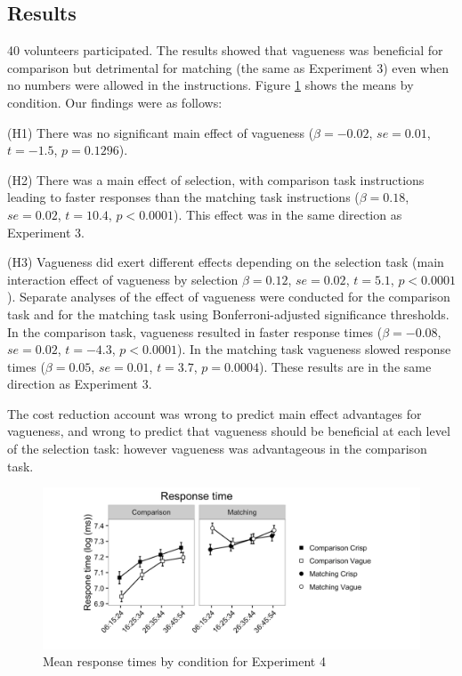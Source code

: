 \documentclass[%
man,		%
floatsintext,%
apacite%
]{apa6}
\begin{document}
\subsection{Results}%
40 volunteers participated.
The results showed that vagueness was beneficial for comparison but detrimental for matching (the same as Experiment 3) even when no numbers were allowed in the instructions. 
Figure \ref{resultse4} shows the means by condition. Our findings were as follows:

{\small
\begin{APAenumerate}
	\item [(H1)] There was no significant main effect of vagueness ($\beta=-0.02$, $se=0.01$, $t=-1.5$, $p=0.1296$). 
	\item [(H2)] There was a main effect of selection, with comparison task instructions leading to faster responses than the matching task instructions ($\beta=0.18$, $se=0.02$, $t=10.4$, $p<0.0001$).  This effect was in the same direction as Experiment 3. 
	\item[(H3)] Vagueness did exert different effects depending on the selection task (main interaction effect of vagueness by selection $\beta=0.12$, $se=0.02$, $t=5.1$, $p<0.0001$). 
Separate analyses of the effect of vagueness were conducted for the comparison task and for the matching task using Bonferroni-adjusted significance thresholds. 
In the comparison task, vagueness resulted in faster response times ($\beta=-0.08$, $se=0.02$, $t=-4.3$, $p<0.0001$). 
In the matching task vagueness slowed response times ($\beta=0.05$, $se=0.01$, $t=3.7$, $p=0.0004$). 
These results are in the same direction as Experiment 3.
\end{APAenumerate}
}

The cost reduction account was wrong to predict main effect advantages for vagueness, and wrong to predict that vagueness should be beneficial at each level of the selection task: however vagueness was advantageous in the comparison task.

\begin{figure}[htbp]
\centering
\includegraphics[trim = 0mm 30mm 0mm 10mm, clip, width=.75\textwidth]{images/rtplote4.pdf}
\caption{Mean response times by condition for Experiment 4}
\label{resultse4}
\end{figure}
\end{document}
